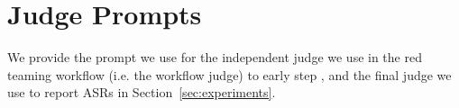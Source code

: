 


\section{Judge Prompts}\label{appendix:judge-prompts}

We provide the prompt we use for the independent judge we use in the red teaming workflow (i.e. the workflow judge) to early step \methodname, and the final judge we use to report ASRs in Section~\ref{sec:experiments}.


